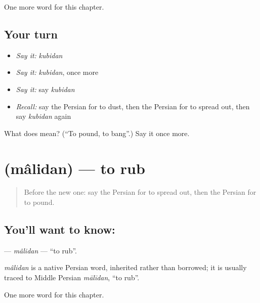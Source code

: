 \begin{grammarlens}[title={What you've built}]
One more word for this chapter.
\end{grammarlens}

\subsection*{Your turn}
\begin{itemize}
\raggedright
  \item \emph{Say it:} \emph{kubidan}
  \item \emph{Say it:} \emph{kubidan}, once more
  \item \emph{Say it:} say \emph{kubidan}
  \item \emph{Recall:} say the Persian for to dust, then the Persian for to spread out, then say \emph{kubidan} again
\end{itemize}

\begin{tcolorbox}[breakable,colback=teal!4,colframe=teal!35!black,title={Before you move on}]
What does  mean? (\textquotedblleft{}To pound, to bang\textquotedblright{}.) Say it once more.
\end{tcolorbox}
\section[\texorpdfstring{\fa{مالیدن} (mâlidan)}{مالیدن (mâlidan)}]{ (mâlidan) — to rub}

\label{lesson:FA-C147-malidan}



\begin{quote}
Before the new one: say the Persian for to spread out, then the Persian for to pound.
\end{quote}

\subsection*{You'll want to know: }
\textbf{} — \emph{mâlidan} — \textquotedblleft{}to rub\textquotedblright{}.

\begin{cousinweb}
\emph{mâlidan} is a native Persian word, inherited rather than borrowed; it is usually traced to Middle Persian \emph{mālīdan}, \textquotedblleft{}to rub\textquotedblright{}.
\end{cousinweb}

\begin{grammarlens}[title={What you've built}]
One more word for this chapter.
\end{grammarlens}

